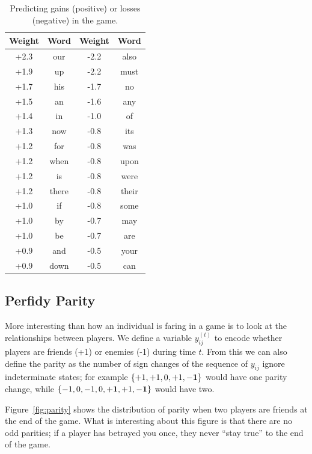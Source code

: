 \documentclass[11pt,letterpaper]{article}
\begin{document}
\begin{table}
  \begin{center}
  \begin{tabular}{cc|cc}
    Weight & Word & Weight & Word \\
    \hline
    +2.3 & our  & -2.2 & also \\
    +1.9 & up   & -2.2 & must \\
    +1.7 & his  & -1.7 & no \\
    +1.5 & an   & -1.6 & any\\
    +1.4 & in   & -1.0 & of\\
    +1.3 & now  & -0.8 & its\\
    +1.2 & for  & -0.8 & was\\
    +1.2 & when & -0.8 & upon\\
    +1.2 & is   & -0.8 & were\\
    +1.2 & there& -0.8 & their\\
    +1.0 & if   & -0.8 & some\\
    +1.0 & by   & -0.7 & may\\
    +1.0 & be   & -0.7 & are\\
    +0.9 & and  & -0.5 & your\\
    +0.9 & down & -0.5 & can\\
    \hline
  \end{tabular}
  \end{center}
  \caption{Predicting gains (positive) or losses (negative) in the game.}
  \label{tab:gain-loss}
\end{table}

\subsection{Perfidy Parity}
\label{sec:parity}

More interesting than how an individual is faring in a game is to look
at the relationships between players.  We define a variable
$y_{ij}^{(t)}$ to encode whether players are friends (+1) or enemies
(-1) during time $t$.  From this we can also define the parity as the
number of sign changes of the sequence of $y_{ij}$ ignore
indeterminate states; for example $\{+1, +1, 0, +1, {\bf -1}\}$ would
have one parity change, while $\{-1, 0, -1, 0, {\bf +1}, +1, {\bf
  -1}\}$ would have two.

Figure~\ref{fig:parity} shows the distribution of parity when two
players are friends at the end of the game.  What is interesting about
this figure is that there are no odd parities; if a player has
betrayed you once, they never ``stay true'' to the end of the game.
\end{document}
